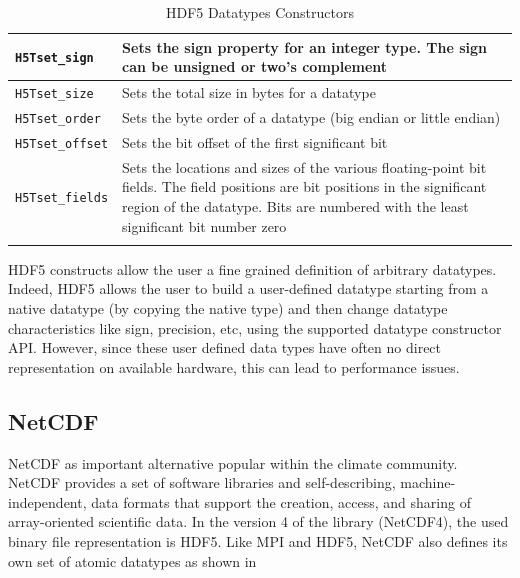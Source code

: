 \documentclass{../../template/esiwace-report}
\begin{document}
\begin{longtable}{|>{\centering\arraybackslash} m{5.5cm} | >{\centering\arraybackslash} m{6cm} |}
        \small \texttt{H5Tset\_sign}             & \small Sets the sign property for an integer type. The sign can be unsigned or %
                                                   two's complement                                                                    \\ \hline
        \small \texttt{H5Tset\_size}             & \small Sets the total size in bytes for a datatype                                  \\ \hline
        \small \texttt{H5Tset\_order}            & \small Sets the byte order of a datatype (big endian or little endian)              \\ \hline
        \small \texttt{H5Tset\_offset}           & \small Sets the bit offset of the first significant bit                             \\ \hline
        \small \texttt{H5Tset\_fields}           & \small Sets the locations and sizes of the various floating-point bit fields. %
                                                   The field positions are bit positions in the significant region of the datatype. %
                                                   Bits are numbered with the least significant bit number zero                        \\ \hline
        \caption{HDF5 Datatypes Constructors}
        \label{table: hdf5-constr}
\end{longtable}

HDF5 constructs allow the user a fine grained definition of arbitrary datatypes. 
Indeed, HDF5 allows the user to build a user-defined datatype starting from a native datatype (by copying the native type) and then change datatype characteristics like sign, precision, etc, using the supported datatype constructor API. 
However, since these user defined data types have often no direct representation on available hardware, this can lead to performance issues.




\subsection{NetCDF}

NetCDF as important alternative popular within the climate community. NetCDF provides a set of software libraries and self-describing, machine-independent, data formats that support the creation, access, and sharing of array-oriented scientific data. 
In the version 4 of the library (NetCDF4), the used binary file representation is HDF5. Like MPI and HDF5, NetCDF also defines its own set of atomic datatypes as shown in 
\end{document}
